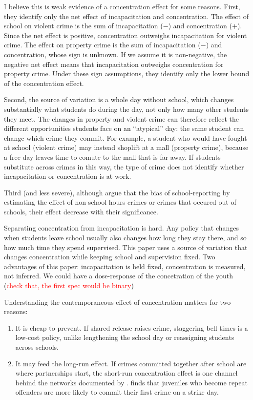 \documentclass[11pt]{article}
\begin{document}
I believe this is weak evidence of a concentration effect for some reasons.
First, they identify only the net effect of incapacitation and concentration.
The effect of school on violent crime is the sum of incapacitation ($-$) and
concentration ($+$). Since the net effect is positive, concentration
outweighs incapacitation for violent crime. The effect on property crime is the
sum of incapacitation ($-$) and concentration, whose sign is unknown. If we
assume it is non-negative, the negative net effect  means that
incapacitation outweighs concentration for property crime. Under these sign
assumptions, they identify only the lower bound of the concentration effect. 


Second, the source of variation is a whole day without school, which changes
substantially what students do during the day, not only how many other students
they meet. The changes in property and violent crime can therefore reflect the
different opportunities students face on an ``atypical'' day: the same student
can change which crime they commit. For example, a student who would have
fought at school (violent crime) may instead shoplift at a mall (property
crime), because a free day leaves time to comute to the mall that is far away.
 If students substitute across crimes in this way, the type of
crime does not  identify whether incapacitation or concentration is at work. 

Third (and less severe), although \citet{jacob2003} argue that the bias of school-reporting by 
estimating the effect of non school hours crimes or crimes that occured out of schools, their effect decrease with their significance. 

Separating concentration from incapacitation is hard. Any policy that changes
when students leave school usually also changes how long they stay there, and
so how much time they spend supervised. This paper uses a source of variation
that changes concentration while keeping school and supervision fixed. 
Two advantages of this paper: incapacitation is held fixed, concentration is measured, not inferred. 
We could have a dose-response of the concetration of the youth (\textcolor{red}{check that, the first spec would be binary})


Understanding the contemporaneous effect of concentration matters for two reasons:
\begin{enumerate}
  \item It is cheap to prevent. If shared release raises crime, staggering bell
        times is a low-cost policy, unlike lengthening the school day or
        reassigning students across schools.
  \item It may feed the long-run effect. If crimes committed together after
        school are where partnerships start, the short-run concentration effect
        is one channel behind the networks documented by \citet{billings2019}. \citet{luallen2006} finds that juveniles who become repeat
        offenders are more likely to commit their first crime on a strike day.
\end{enumerate}
\end{document}
